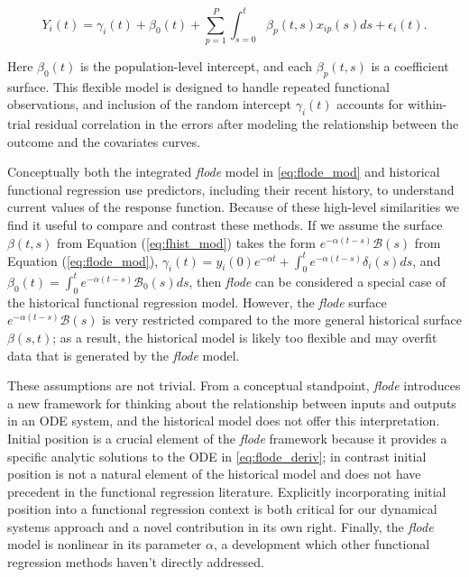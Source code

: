 \documentclass[preprint]{JASA}
\begin{document}
\begin{equation}
\label{eq:fhist_mod}    
Y_i(t) = \gamma_i(t) + \beta_0(t) +  \sum_{p = 1}^P \int_{s = 0}^t \beta_p(t,s) x_{ip}(s)ds+ \epsilon_i(t).
\end{equation}

\noindent Here \(\beta_0(t)\) is the population-level intercept, and
each \(\beta_p(t,s)\) is a coefficient surface. This flexible model is
designed to handle repeated functional observations, and inclusion of
the random intercept \(\gamma_i(t)\) accounts for within-trial residual
correlation in the errors after modeling the relationship between the
outcome and the covariates curves.

Conceptually both the integrated \emph{flode} model in
\ref{eq:flode_mod} and historical functional regression use predictors,
including their recent history, to understand current values of the
response function. Because of these high-level similarities we find it
useful to compare and contrast these methods. If we assume the surface
\(\beta(t,s)\) from Equation (\ref{eq:fhist_mod}) takes the form
\(e^{-\alpha (t-s)} \mathcal{B}(s)\) from Equation (\ref{eq:flode_mod}),
\(\gamma_i(t) = y_i(0)e^{-\alpha t} + \int_0^t e^{-\alpha (t-s)}\delta_i(s)ds\),
and \(\beta_0(t) = \int_0^t e^{-\alpha (t-s)}\mathcal{B}_0(s)ds\), then
\emph{flode} can be considered a special case of the historical
functional regression model. However, the \emph{flode} surface
\(e^{-\alpha (t-s)} \mathcal{B}(s)\) is very restricted compared to the
more general historical surface \(\beta(s,t)\); as a result, the
historical model is likely too flexible and may overfit data that is
generated by the \emph{flode} model.

These assumptions are not trivial. From a conceptual standpoint,
\emph{flode} introduces a new framework for thinking about the
relationship between inputs and outputs in an ODE system, and the
historical model does not offer this interpretation. Initial position is
a crucial element of the \emph{flode} framework because it provides a
specific analytic solutions to the ODE in \ref{eq:flode_deriv}; in
contrast initial position is not a natural element of the historical
model and does not have precedent in the functional regression
literature. Explicitly incorporating initial position into a functional
regression context is both critical for our dynamical systems approach
and a novel contribution in its own right. Finally, the \emph{flode}
model is nonlinear in its parameter \(\alpha\), a development which
other functional regression methods haven't directly addressed.
\end{document}
